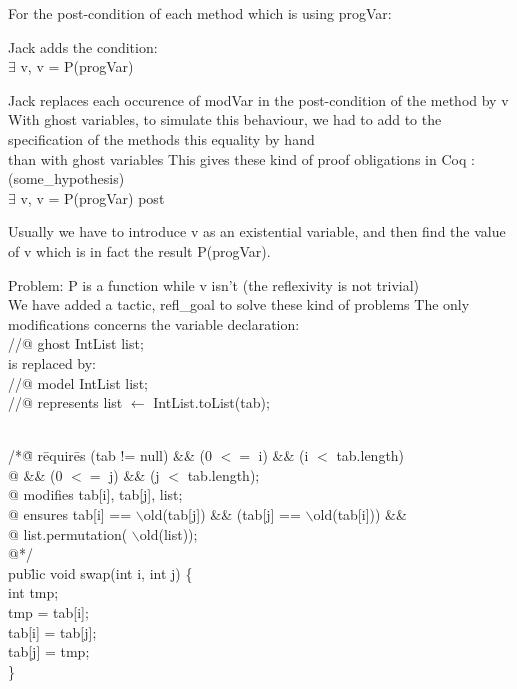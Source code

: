 \small
For the post-condition of each method which is {\purple using progVar}:
\blist
\item Jack adds the condition:\\
$\exists$ v, v = P(progVar)
\item Jack replaces each occurence of modVar in the post-condition 
of the method by v
\elist
With ghost variables, to simulate this behaviour, 
we had to add to the specification of the methods this equality by hand\\
 than with ghost variables
\small
This gives these kind of proof obligations in Coq :\\
(some\_hypothesis) \rarrow\\
$\exists$ v, v = P(progVar) \conj post 
\blist
\item Usually we have to introduce v as an existential variable, 
and then {\purple find the value} of v which is in fact the result P(progVar).
\item Problem: P is a {\purple function} while v isn't (the reflexivity is not trivial)
\\
\rarrow We have added a tactic, {\purple refl\_goal} to solve these kind of problems
\elist
{}
\small 
The only modifications concerns the {\purple variable declaration}:\\
//@ {\purple ghost} IntList list;\\
is replaced by:\\
//@ {\purple model} IntList list;\\
//@ {\purple represents} list $\leftarrow$  IntList.toList(tab);\\
\\
\small	
\begin{tabbing}
/*\=@ \+
   {\purple r}\={\purple equir}\={\purple es} (tab != null) \&\& (0 $<=$ i) \&\& (i $<$ tab.length)\\ 
  @ \>\> \&\& (0 $<=$ j) \&\& (j $<$ tab.length);\\
  @ {\purple modifies} tab[i], tab[j], list;\\
  @ {\purple ensures} tab[i] == $\backslash$old(tab[j]) \&\& (tab[j] ==  $\backslash$old(tab[i])) \&\& \\
  @ \>\>  list.permutation( $\backslash$old(list));\\
  @*/\\
  pub\=lic void swap(int i, int j) \+\{\\
     int tmp;\\
     tmp = tab[i];\\
     tab[i] = tab[j];\\
     tab[j] = tmp;\-\\
  \}
\end{tabbing}
